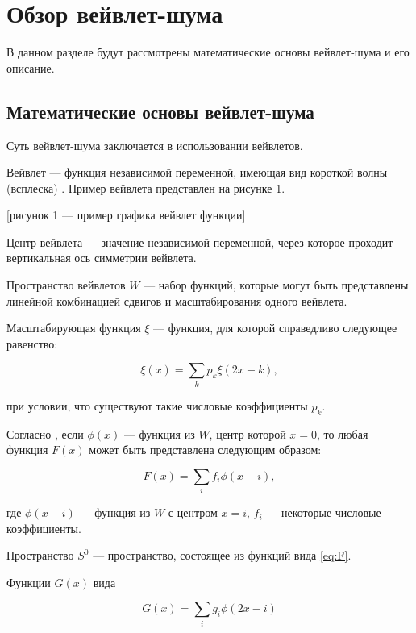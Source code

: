 \chapter{Обзор вейвлет-шума}

В данном разделе будут рассмотрены математические основы вейвлет-шума и его описание.

\section{Математические основы вейвлет-шума}

Суть вейвлет-шума заключается в использовании вейвлетов.

Вейвлет --- функция независимой переменной, имеющая вид короткой волны (всплеска) \cite{Kryzhevich,Smolentsev,Malla}. Пример вейвлета представлен на рисунке 1.

[рисунок 1 --- пример графика вейвлет функции]

Центр вейвлета --- значение независимой переменной, через которое проходит вертикальная ось симметрии вейвлета.

Пространство вейвлетов $W$ --- набор функций, которые могут быть представлены линейной комбинацией сдвигов и масштабирования одного вейвлета. \cite{Novikov,Meyer}

Масштабирующая функция $\xi$ --- функция, для которой справедливо следующее равенство:

\begin{equation}\label{eq:refine}
	\xi(x)=\sum_{k}p_k\xi(2x-k),
\end{equation}

при условии, что существуют такие числовые коэффициенты $p_k$. \cite{pixar,Novikov}

Согласно \cite{pixar}, если $\phi(x)$ --- функция из $W$, центр которой $x=0$, то любая функция $F(x)$ может быть представлена следующим образом:

\begin{equation}\label{eq:F}
	F(x)=\sum_{i}f_i\phi(x-i),
\end{equation}

где $\phi(x-i)$ --- функция из $W$ с центром $x=i$, $f_i$ --- некоторые числовые коэффициенты.

Пространство $S^0$ --- пространство, состоящее из функций вида \ref{eq:F}.

Функции $G(x)$ вида

\begin{equation}\label{eq:G}
	G(x)=\sum_{i}g_i\phi(2x-i)
\end{equation}

